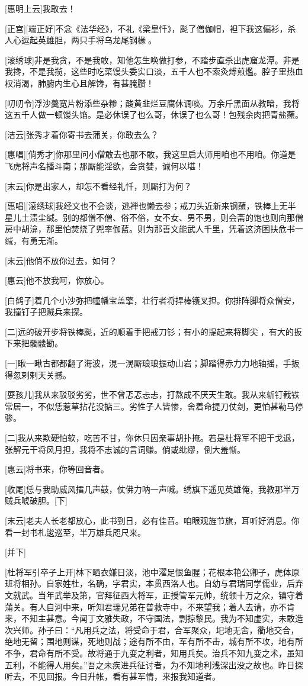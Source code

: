 \documentclass{book}
\begin{document}
[惠明上云]我敢去！

[正宫][端正好]不念《法华经》，不礼《梁皇忏》，颩了僧伽帽，袒下我这偏衫，杀人心逗起英雄胆，两只手将乌龙尾钢椽𭡗。

[滚绣球]非是我贪，不是我敢，知他怎生唤做打参，不踏步直杀出虎窟龙潭。非是我搀，不是我揽，这些时吃菜馒头委实口淡，五千人也不索灸煿煎爁。腔子里热血权消渴，肺腑内生心且解馋，有甚腌臜！

[叨叨令]浮沙羹宽片粉添些杂糁；酸黄韭烂豆腐休调啖。万余斤黑面从教暗，我将这五千人做一顿馒头馅。是必休误了也么哥，休误了也么哥！包残余肉把青盐蘸。

[洁云]张秀才着你寄书去蒲关，你敢去么？

[惠唱][倘秀才]你那里问小僧敢去也那不敢，我这里启大师用咱也不用咱。你道是飞虎将声名播斗南；那厮能淫欲，会贪婪，诚何以堪！

[末云]你是出家人，却怎不看经礼忏，则厮打为何？

[惠唱][滚绣球]我经文也不会谈，逃禅也懒去参；戒刀头近新来钢蘸，铁棒上无半星儿土渍尘缄。别的都僧不僧、俗不俗，女不女、男不男，则会斋的饱也则向那僧房中胡渰，那里怕焚烧了兜率伽蓝。则为那善文能武人千里，凭着这济困扶危书一缄，有勇无渐。

[末云]他倘不放你过去，如何？

[惠云]他不放我呵，你放心。

[白鹤子]着几个小沙弥把幢幡宝盖擎，壮行者将捍棒镬叉担。你排阵脚将众僧安，我撞钉子把贼兵来探。

[二]远的破开步将铁棒颩，近的顺着手把戒刀钐；有小的提起来将脚尖𨀵，有大的扳下来把髑髅勘。

[一]瞅一瞅古都都翻了海波，滉一滉厮琅琅振动山岩；脚踏得赤力力地轴摇，手扳得忽剌剌天关撼。

[耍孩儿]我从来驳驳劣劣，世不曾忑忑忐忐，打熬成不厌天生敢。我从来斩钉截铁常居一，不似恁惹草拈花没掂三。劣性子人皆惨，舍着命提刀仗剑，更怕甚勒马停骖。

[二]我从来欺硬怕软，吃苦不甘，你休只因亲事胡扑掩。若是杜将军不把干戈退，张解元干将风月担，我将不志诚的言词赚。倘或纰缪，倒大羞惭。

[惠云]将书来，你等回音者。

[收尾]恁与我助威风擂几声鼓，仗佛力呐一声喊。绣旗下遥见英雄俺，我教那半万贼兵唬破胆。[下]

[末云]老夫人长老都放心，此书到日，必有佳音。咱眼观旌节旗，耳听好消息。你看一封书札逡巡至，半万雄兵咫尺来。

[并下]

[杜将军引卒子上开]林下晒衣嫌日淡，池中濯足恨鱼腥；花根本艳公卿子，虎体原班将相孙。自家姓杜，名确，字君实，本贯西洛人也。自幼与君瑞同学儒业，后弃文就武。当年武举及第，官拜征西大将军，正授管军元帅，统领十万之众，镇守着蒲关。有人自河中来，听知君瑞兄弟在普救寺中，不来望我；着人去请，亦不肯来，不知主甚意。今闻丁文雅失政，不守国法，剽掠黎民。我为不知虚实，未敢造次兴师。孙子曰：``凡用兵之法，将受命于君，合军聚众，圯地无舍，衢地交合，绝地无留；围地则谋，死地则战；途有所不由，军有所不击，城有所不攻，地有所不争，君命有所不受。故将通于九变之利者，知用兵矣。治兵不知九变之术，虽知五利，不能得人用矣。''吾之未疾进兵征讨者，为不知地利浅深出没之故也。昨日探听去，不见回报。今日升帐，看有甚军情，来报我知道者。
\end{document}
